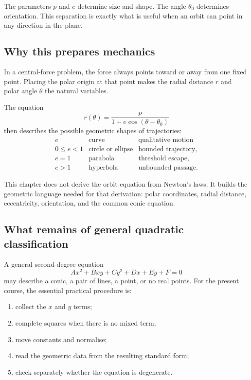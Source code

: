 \begin{interpretationbox}
The parameters $p$ and $e$ determine size and shape. The angle $\theta_0$
determines orientation. This separation is exactly what is useful when an orbit
can point in any direction in the plane.
\end{interpretationbox}

\subsection{Why this prepares mechanics}

In a central-force problem, the force always points toward or away from one
fixed point. Placing the polar origin at that point makes the radial distance
$r$ and polar angle $\theta$ the natural variables.

The equation
\[
\boxed{r(\theta)=\frac{p}{1+e\cos(\theta-\theta_0)}}
\]
then describes the possible geometric shapes of trajectories:
\[
\begin{array}{c|c|c}
e & \text{curve} & \text{qualitative motion}\\
\hline
0\leq e<1 & \text{circle or ellipse} & \text{bounded trajectory},\\
e=1 & \text{parabola} & \text{threshold escape},\\
e>1 & \text{hyperbola} & \text{unbounded passage}.
\end{array}
\]

\begin{corebox}
This chapter does not derive the orbit equation from Newton's laws. It builds
the geometric language needed for that derivation: polar coordinates, radial
distance, eccentricity, orientation, and the common conic equation.
\end{corebox}

\subsection{What remains of general quadratic classification}

A general second-degree equation
\[
Ax^2+Bxy+Cy^2+Dx+Ey+F=0
\]
may describe a conic, a pair of lines, a point, or no real points. For the
present course, the essential practical procedure is:

\begin{enumerate}
    \item collect the $x$ and $y$ terms;
    \item complete squares when there is no mixed term;
    \item move constants and normalise;
    \item read the geometric data from the resulting standard form;
    \item check separately whether the equation is degenerate.
\end{enumerate}

